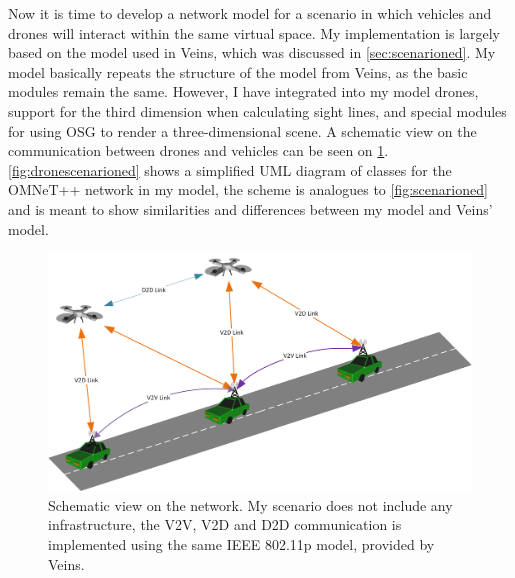 \documentclass[]{nsm-thesis}
\begin{document}
Now it is time to develop a network model for a scenario in which vehicles and drones will interact within the same virtual space. My implementation is largely based on the model used in Veins, which was discussed in \cref{sec:scenarioned}. My model basically repeats the structure of the model from Veins, as the basic modules remain the same. However, I have integrated into my model drones, support for the third dimension when calculating sight lines, and special modules for using OSG to render a three-dimensional scene. A schematic view on the communication between drones and vehicles can be seen on \cref{fig:vanetscheme}. \cref{fig:dronescenarioned} shows a simplified UML diagram of classes for the OMNeT++ network in my model, the scheme is analogues to \cref{fig:scenarioned} and is meant to show similarities and differences between my model and Veins' model.

\begin{figure}
	\centering
	\includegraphics[width=1\textwidth]{figures/DAVNScheme.png}
	\caption{Schematic view on the network. My scenario does not include any infrastructure, the \ac{V2V}, \ac{V2D} and \ac{D2D} communication is implemented using the same IEEE 802.11p model, provided by Veins.}
	\label{fig:vanetscheme}
\end{figure}
\end{document}
